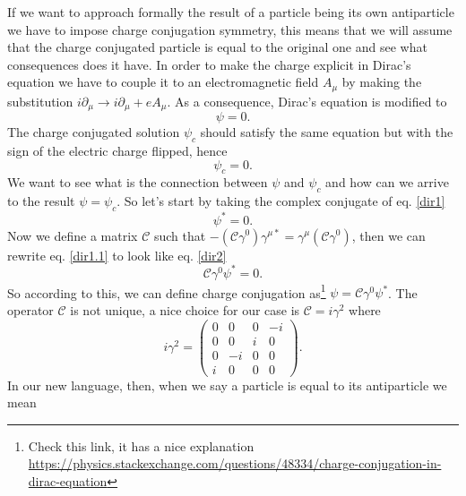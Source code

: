 If we want to approach formally the result of a particle being its own antiparticle we have to impose charge conjugation symmetry, this means that we will assume that the charge conjugated particle is equal to the original one and see what consequences does it have. In order to make the charge explicit in Dirac's equation we have to couple it to an electromagnetic field $A_\mu$ by making the substitution $i\partial_\mu \rightarrow i\partial_\mu + eA_\mu$. As a consequence, Dirac's equation is modified to
\begin{equation}
    [\gamma^\mu(i\partial_\mu + eA_\mu) - m]\psi = 0.
    \label{dir1}
\end{equation}
The charge conjugated solution $\psi_c$ should satisfy the same equation but with the sign of the electric charge flipped, hence
\begin{equation}
    [\gamma^\mu(i\partial_\mu - eA_\mu) - m]\psi_c = 0.
    \label{dir2}
\end{equation}
We want to see what is the connection between $\psi$ and $\psi_c$ and how can we arrive to the result $\psi = \psi_c$. So let's start by taking the complex conjugate of eq. \ref{dir1}
\begin{equation}
    [-\gamma^{\mu*}(i\partial_\mu - eA_\mu) - m]\psi^* = 0.
    \label{dir1.1}
\end{equation}
Now we define a matrix $\mathcal{C}$ such that $-(\mathcal{C}\gamma^0)\gamma^{\mu*} = \gamma^\mu(\mathcal{C}\gamma^0)$, then we can rewrite eq. \ref{dir1.1} to look like eq. \ref{dir2}
\begin{equation}
    [\gamma^\mu(i\partial_\mu - eA_\mu) - m]\mathcal{C}\gamma^0\psi^* = 0.
\end{equation}
So according to this, we can define charge conjugation as\footnote{Check this link, it has a nice explanation \url{https://physics.stackexchange.com/questions/48334/charge-conjugation-in-dirac-equation}} $\psi = \mathcal{C}\gamma^0 \psi^*$. The operator $\mathcal{C}$ is not unique, a nice choice for our case is $\mathcal{C} = i\gamma^2$ where
\begin{equation}
    i\gamma^2 = \begin{pmatrix}
    0 & 0 & 0 & -i \\
    0 & 0 & i & 0 \\
    0 & -i & 0 & 0 \\
    i & 0 & 0 & 0
    \end{pmatrix}.
\end{equation}
In our new language, then, when we say a particle is equal to its antiparticle we mean

